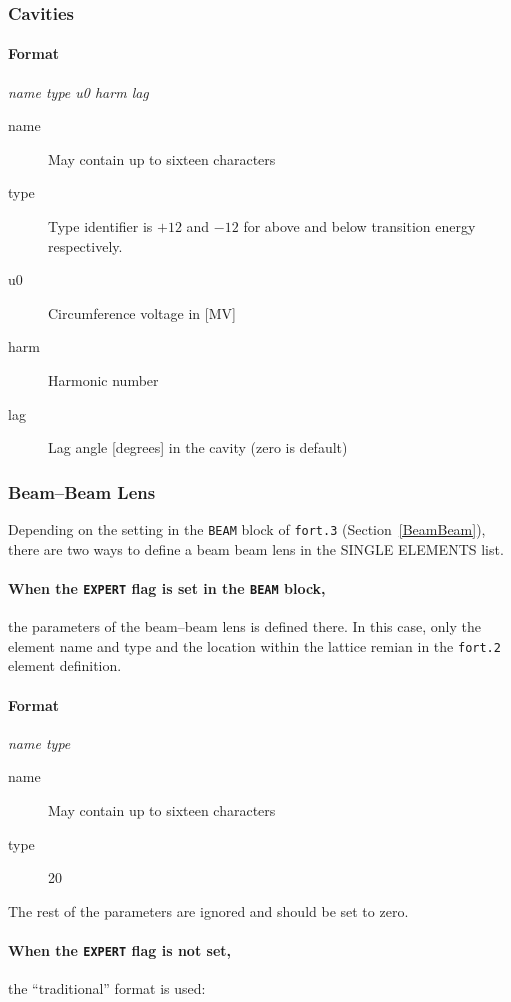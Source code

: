 \documentclass[a4paper,11pt]{report}
\begin{document}
\subsubsection{Cavities} \label{Cavities}
\paragraph{Format} {\em name type u0 harm lag}
\begin{description}
\item [name] May contain up to sixteen characters
\item [type] Type identifier is $+12$ and $-12$ for above and below
  transition energy respectively.
\item [u0] Circumference voltage in [MV]
\item [harm] Harmonic number
\item [lag] Lag angle [degrees] in the cavity (zero is default)
\end{description}

\subsubsection{Beam--Beam Lens}
\label{BBS}
Depending on the setting in the \texttt{BEAM} block of \texttt{fort.3} (Section~\ref{BeamBeam}), there are two ways to define a beam beam lens in the SINGLE ELEMENTS list.

\paragraph{When the \texttt{EXPERT} flag is set in the \texttt{BEAM} block,} the parameters of the beam--beam lens is defined there.
In this case, only the element name and type and the location within the lattice remian in the \texttt{fort.2} element definition.
\paragraph{Format} {\em name type}
\begin{description}
\item [name] May contain up to sixteen characters
\item [type] 20
\end{description}
The rest of the parameters are ignored and should be set to zero.

\paragraph{When the \texttt{EXPERT} flag is not set,} the ``traditional'' format is used:
\end{document}
